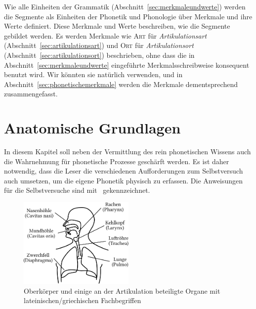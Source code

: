 
Wie alle Einheiten der Grammatik (Abschnitt~\ref{sec:merkmaleundwerte}) werden die Segmente als Einheiten der Phonetik und Phonologie über Merkmale und ihre Werte definiert.
Diese Merkmale und Werte beschreiben, wie die Segmente gebildet werden.
Es werden Merkmale wie \textsc{Art} für \textit{Artikulationsart} (Abschnitt~\ref{sec:artikulationsart}) und \textsc{Ort} für \textit{Artikulationsort} (Abschnitt~\ref{sec:artikulationsort}) beschrieben, ohne dass die in Abschnitt~\ref{sec:merkmaleundwerte} eingeführte Merkmalsschreibweise konsequent benutzt wird.
Wir könnten sie natürlich verwenden, und in Abschnitt~\ref{sec:phonetischemerkmale} werden die Merkmale dementsprechend zusammengefasst.


\section{Anatomische Grundlagen}
\label{sec:anatomischegrundlagen}

In diesem Kapitel soll neben der Vermittlung des rein phonetischen Wissens auch die Wahrnehmung für phonetische Prozesse geschärft werden.
Es ist daher notwendig, dass die Leser die verschiedenen Aufforderungen zum Selbstversuch auch umsetzen, um die eigene Phonetik physisch zu erfassen.
Die Anweisungen für die Selbstversuche sind mit \TuBegin\ gekennzeichnet.

\begin{figure}[!htbp]
  \centering
  \includegraphics[width=0.5\textwidth]{figures/ueberblick}
  \caption{Oberkörper und einige an der Artikulation beteiligte Organe mit lateinischen\slash griechischen Fachbegriffen}
  \label{fig:anatomischegrundlagen002}
\end{figure}

